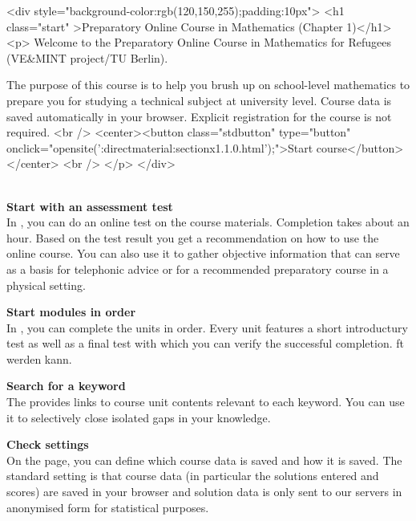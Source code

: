 \begin{MSectionStart}
\MGlobalStart
\begin{html}

<div style="background-color:rgb(120,150,255);padding:10px">
<h1 class="start" >Preparatory Online Course in Mathematics (Chapter 1)</h1>
<p>
Welcome to the Preparatory Online Course in Mathematics for Refugees (VE&MINT project/TU Berlin).

The purpose of this course is to help you brush up on school-level mathematics to prepare you for studying a technical subject at university level.
Course data is saved automatically in your browser. Explicit registration for the course is not required.
<br />
<center><button class="stdbutton" type="button" onclick="opensite(':directmaterial:sectionx1.1.0.html');">Start course</button></center>
<br />
</p>
</div>
\end{html}

\ \\
\textbf{Start with an assessment test}\\
In , you can do an online test on the course materials. Completion takes about an hour.
Based on the test result you get a recommendation on how to use the online course.
You can also use it to gather objective information that can serve as a basis for telephonic advice
or for a recommended preparatory course in a physical setting.

\textbf{Start modules in order}\\
In , you can complete the units in order. Every unit features a short introductury test
as well as a final test with which you can verify the successful completion. ft werden kann.

\textbf{Search for a keyword}\\
The  provides links to course unit contents relevant to each keyword.
You can use it to selectively close isolated gaps in your knowledge.

\textbf{Check settings}\\
On the  page, you can define which course data is saved and how it is saved.
The standard setting is that course data (in particular the solutions entered and scores) are saved in your
browser and solution data is only sent to our servers in anonymised form for statistical purposes.


\end{MSectionStart}
